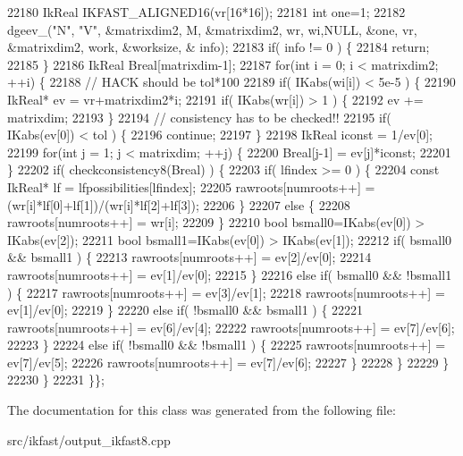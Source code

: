 \begin{DoxyCode}
22180     IkReal IKFAST\_ALIGNED16(vr[16*16]);
22181     \textcolor{keywordtype}{int} one=1;
22182     dgeev\_(\textcolor{stringliteral}{"N"}, \textcolor{stringliteral}{"V"}, &matrixdim2, M, &matrixdim2, wr, wi,NULL, &one, vr, &matrixdim2, work, &worksize, &
      info);
22183     \textcolor{keywordflow}{if}( info != 0 ) \{
22184         \textcolor{keywordflow}{return};
22185     \}
22186     IkReal Breal[matrixdim-1];
22187     \textcolor{keywordflow}{for}(\textcolor{keywordtype}{int} i = 0; i < matrixdim2; ++i) \{
22188         \textcolor{comment}{// HACK should be tol*100}
22189         \textcolor{keywordflow}{if}( IKabs(wi[i]) < 5e-5 ) \{
22190             IkReal* ev = vr+matrixdim2*i;
22191             \textcolor{keywordflow}{if}( IKabs(wr[i]) > 1 ) \{
22192                 ev += matrixdim;
22193             \}
22194             \textcolor{comment}{// consistency has to be checked!!}
22195             \textcolor{keywordflow}{if}( IKabs(ev[0]) < tol ) \{
22196                 \textcolor{keywordflow}{continue};
22197             \}
22198             IkReal iconst = 1/ev[0];
22199             \textcolor{keywordflow}{for}(\textcolor{keywordtype}{int} j = 1; j < matrixdim; ++j) \{
22200                 Breal[j-1] = ev[j]*iconst;
22201             \}
22202             \textcolor{keywordflow}{if}( checkconsistency8(Breal) ) \{
22203                 \textcolor{keywordflow}{if}( lfindex >= 0 ) \{
22204                     \textcolor{keyword}{const} IkReal* lf = lfpossibilities[lfindex];
22205                     rawroots[numroots++] = (wr[i]*lf[0]+lf[1])/(wr[i]*lf[2]+lf[3]);
22206                 \}
22207                 \textcolor{keywordflow}{else} \{
22208                     rawroots[numroots++] = wr[i];
22209                 \}
22210                 \textcolor{keywordtype}{bool} bsmall0=IKabs(ev[0]) > IKabs(ev[2]);
22211                 \textcolor{keywordtype}{bool} bsmall1=IKabs(ev[0]) > IKabs(ev[1]);
22212                 \textcolor{keywordflow}{if}( bsmall0 && bsmall1 ) \{
22213                     rawroots[numroots++] = ev[2]/ev[0];
22214                     rawroots[numroots++] = ev[1]/ev[0];
22215                 \}
22216                 \textcolor{keywordflow}{else} \textcolor{keywordflow}{if}( bsmall0 && !bsmall1 ) \{
22217                     rawroots[numroots++] = ev[3]/ev[1];
22218                     rawroots[numroots++] = ev[1]/ev[0];
22219                 \}
22220                 \textcolor{keywordflow}{else} \textcolor{keywordflow}{if}( !bsmall0 && bsmall1 ) \{
22221                     rawroots[numroots++] = ev[6]/ev[4];
22222                     rawroots[numroots++] = ev[7]/ev[6];
22223                 \}
22224                 \textcolor{keywordflow}{else} \textcolor{keywordflow}{if}( !bsmall0 && !bsmall1 ) \{
22225                     rawroots[numroots++] = ev[7]/ev[5];
22226                     rawroots[numroots++] = ev[7]/ev[6];
22227                 \}
22228             \}
22229         \}
22230     \}
22231 \}\};
\end{DoxyCode}


The documentation for this class was generated from the following file\-:\begin{DoxyCompactItemize}
\item 
src/ikfast/output\-\_\-ikfast8.\-cpp\end{DoxyCompactItemize}
